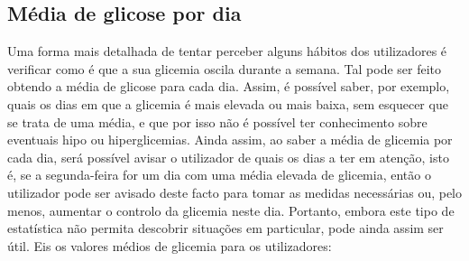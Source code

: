 \subsection{Média de glicose por dia}

Uma forma mais detalhada de tentar perceber alguns hábitos dos utilizadores é verificar como é que a sua glicemia oscila durante a semana. Tal pode ser feito obtendo a média de glicose para cada dia. Assim, é possível saber, por exemplo, quais os dias em que a glicemia é mais elevada ou mais baixa, sem esquecer que se trata de uma média, e que por isso não é possível ter conhecimento sobre eventuais hipo ou hiperglicemias. Ainda assim, ao saber a média de glicemia por cada dia, será possível avisar o utilizador de quais os dias a ter em atenção, isto é, se a segunda-feira for um dia com uma média elevada de glicemia, então o utilizador pode ser avisado deste facto para tomar as medidas necessárias ou, pelo menos, aumentar o controlo da glicemia neste dia. Portanto, embora este tipo de estatística não permita descobrir situações em particular, pode ainda assim ser útil. Eis os valores médios de glicemia para os utilizadores:\newline




